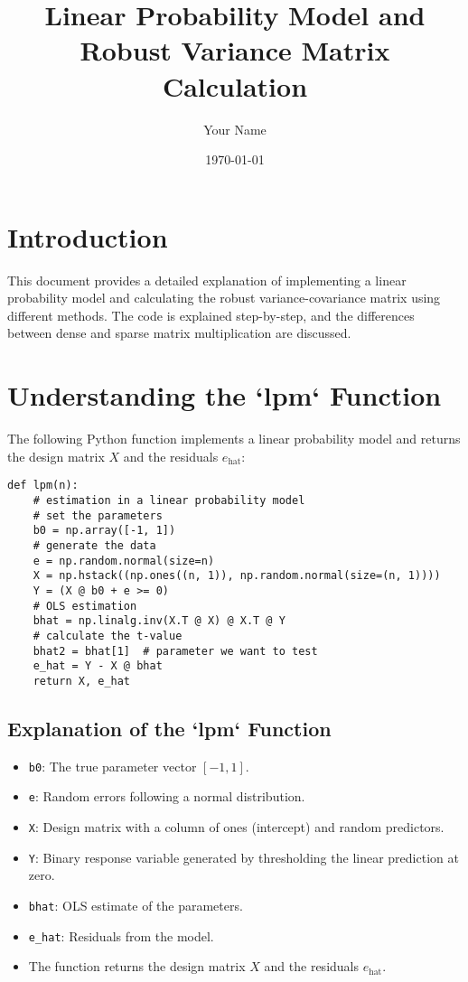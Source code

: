 \documentclass{article}
\title{Linear Probability Model and Robust Variance Matrix Calculation}
\author{Your Name}
\date{\today}
\begin{document}
\maketitle

\section{Introduction}
This document provides a detailed explanation of implementing a linear probability model and calculating the robust variance-covariance matrix using different methods. The code is explained step-by-step, and the differences between dense and sparse matrix multiplication are discussed.

\section{Understanding the `lpm` Function}

The following Python function implements a linear probability model and returns the design matrix \(X\) and the residuals \(e_{\text{hat}}\):

\begin{lstlisting}[caption={Linear Probability Model Function}, label={lst:lpm_function}]
def lpm(n):
    # estimation in a linear probability model
    # set the parameters
    b0 = np.array([-1, 1])
    # generate the data
    e = np.random.normal(size=n)
    X = np.hstack((np.ones((n, 1)), np.random.normal(size=(n, 1))))
    Y = (X @ b0 + e >= 0)
    # OLS estimation
    bhat = np.linalg.inv(X.T @ X) @ X.T @ Y
    # calculate the t-value
    bhat2 = bhat[1]  # parameter we want to test
    e_hat = Y - X @ bhat
    return X, e_hat
\end{lstlisting}

\subsection{Explanation of the `lpm` Function}
\begin{itemize}
    \item \texttt{b0}: The true parameter vector \([-1, 1]\).
    \item \texttt{e}: Random errors following a normal distribution.
    \item \texttt{X}: Design matrix with a column of ones (intercept) and random predictors.
    \item \texttt{Y}: Binary response variable generated by thresholding the linear prediction at zero.
    \item \texttt{bhat}: OLS estimate of the parameters.
    \item \texttt{e\_hat}: Residuals from the model.
    \item The function returns the design matrix \(X\) and the residuals \(e_{\text{hat}}\).
\end{itemize}
\end{document}
